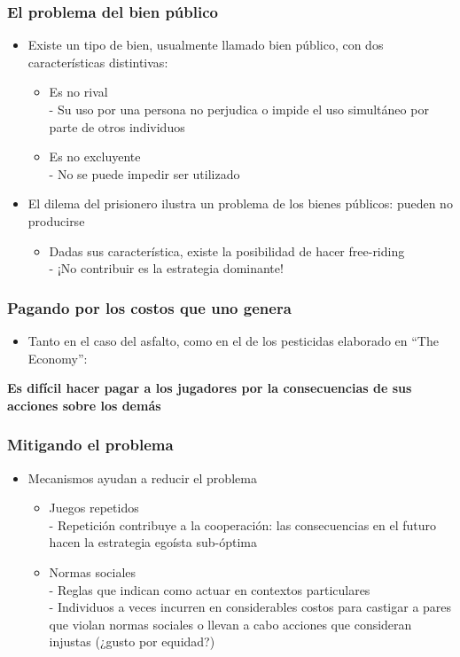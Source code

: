 \documentclass{beamer}
\begin{document}
\begin{frame}
\frametitle{El problema del bien público}
\begin{itemize}
    \item Existe un tipo de bien, usualmente llamado bien público, con dos características distintivas:
    \begin{itemize}
        \item Es no rival \\
        - Su uso por una persona no perjudica o impide el uso simultáneo por parte de otros individuos
        \item Es no excluyente \\
        - No se puede impedir ser utilizado
    \end{itemize}
    \item El dilema del prisionero ilustra un problema de los bienes públicos: pueden no producirse
    \begin{itemize}
        \item Dadas sus característica, existe la posibilidad de hacer free-riding \\
        - ¡No contribuir es la estrategia dominante!
    \end{itemize}
\end{itemize}
\end{frame}

\begin{frame}
\frametitle{ Pagando por los costos que uno genera}
\begin{itemize}
    \item Tanto en el caso del asfalto, como en el de los pesticidas elaborado en “The Economy”: \\
\end{itemize}
\vspace{5mm}
\textbf{Es difícil hacer pagar a los jugadores por la
consecuencias de sus acciones sobre los demás}
\end{frame}

\begin{frame}
\frametitle{ Mitigando el problema}
\begin{itemize}
    \item Mecanismos ayudan a reducir el problema
    \begin{itemize}
        \item Juegos repetidos \\
        - Repetición contribuye a la cooperación: las consecuencias en el futuro hacen la estrategia egoísta sub-óptima
        \item Normas sociales \\
        - Reglas que indican como actuar en contextos particulares \\
        - Individuos a veces incurren en considerables costos para castigar a pares que violan normas sociales o llevan a cabo acciones que consideran injustas (¿gusto por equidad?)
    \end{itemize}
\end{itemize}
\end{frame}
\end{document}
